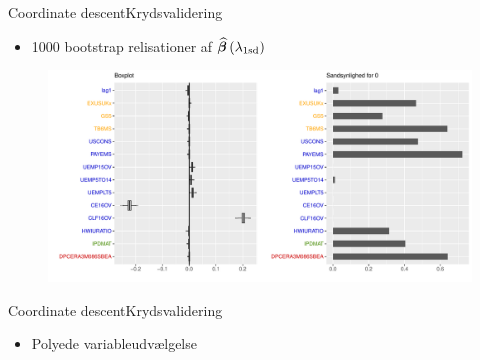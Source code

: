 \begin{frame}{Coordinate descent}{Krydsvalidering}
\begin{itemize}
\item 1000 bootstrap relisationer af $\widehat{\vbeta} \del{\lambda_{1\text{sd}}}$
\end{itemize}
\begin{figure}[!htb]
        \includegraphics[width=1\linewidth, height=0.7\textheight]{slides/boxplot_lasso_coord_kryds.pdf}
\end{figure}
\end{frame}

\begin{frame}{Coordinate descent}{Krydsvalidering}
\begin{itemize}
\item Polyede variableudvælgelse 
\end{itemize}

\end{frame}

